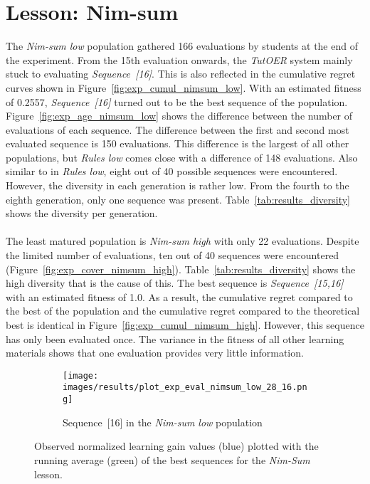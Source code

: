 \section{Lesson: Nim-sum}
\label{sec:results_nimsum}
The \emph{Nim-sum low} population gathered 166 evaluations by students at the
end of the experiment. From the 15th evaluation onwards, the \emph{TutOER}
system mainly stuck to evaluating \emph{Sequence~[16]}. This is also reflected
in the cumulative regret curves shown in Figure~\ref{fig:exp_cumul_nimsum_low}.
With an estimated fitness of 0.2557, \emph{Sequence~[16]} turned out to be the
best sequence of the population. Figure~\ref{fig:exp_age_nimsum_low} shows the
difference between the number of evaluations of each sequence. The difference
between the first and second most evaluated sequence is 150 evaluations. This
difference is the largest of all other populations, but \emph{Rules low} comes
close with a difference of 148 evaluations. Also similar to in \emph{Rules
low}, eight out of 40 possible sequences were encountered. However, the
diversity in each generation is rather low. From the fourth to the eighth
generation, only one sequence was present. Table~\ref{tab:results_diversity}
shows the diversity per generation.\\\\
\noindent
The least matured population is \emph{Nim-sum high} with only 22 evaluations.
Despite the limited number of evaluations, ten out of 40 sequences were
encountered (Figure~\ref{fig:exp_cover_nimsum_high}).
Table~\ref{tab:results_diversity} shows the high diversity that is the cause of
this. The best sequence is \emph{Sequence~[15,16]} with an estimated fitness of
1.0. As a result, the cumulative regret compared to the best of the population
and the cumulative regret compared to the theoretical best is identical in
Figure~\ref{fig:exp_cumul_nimsum_high}. However, this sequence has only been
evaluated once. The variance in the fitness of all other learning materials
shows that one evaluation provides very little information.

\begin{figure}[ht]
	\begin{subfigure}{0.9\linewidth}
	\centering
	\texttt{[image: images/results/plot\_exp\_eval\_nimsum\_low\_28\_16.png]}
	\caption{Sequence~[16] in the \emph{Nim-sum low} population}
	\label{fig:exp_eval_nimsum_low_28}
	\end{subfigure}
	\caption{Observed normalized learning gain values (blue) plotted with the
		running average (green) of the best sequences for the \emph{Nim-Sum}
	lesson.}
	\label{fig:exp_eval_nimsum}
\end{figure}

